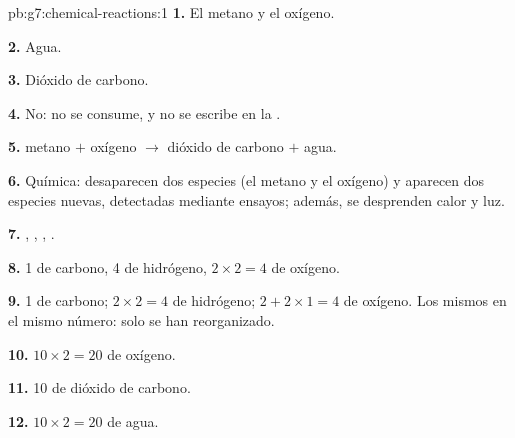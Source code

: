 \begin{solution}{pb:g7:chemical-reactions:1}
\textbf{1.} El metano y el oxígeno.

\textbf{2.} Agua.

\textbf{3.} Dióxido de carbono.

\textbf{4.} No: no se consume, y no se escribe en la .

\textbf{5.} metano $+$ oxígeno $\longrightarrow$ dióxido de carbono $+$
agua.

\textbf{6.} Química: desaparecen dos especies (el metano y el oxígeno) y
aparecen dos especies nuevas, detectadas mediante ensayos; además, se
desprenden calor y luz.

\textbf{7.} , , , .

\textbf{8.} 1 de carbono, 4 de hidrógeno, $2 \times 2 = 4$ de oxígeno.

\textbf{9.} 1 de carbono; $2 \times 2 = 4$ de hidrógeno; $2 + 2 \times 1 = 4$
de oxígeno. Los mismos  en el mismo número: solo se han
reorganizado.

\textbf{10.} $10 \times 2 = 20$  de oxígeno.

\textbf{11.} 10  de dióxido de carbono.

\textbf{12.} $10 \times 2 = 20$  de agua.
\end{solution}
